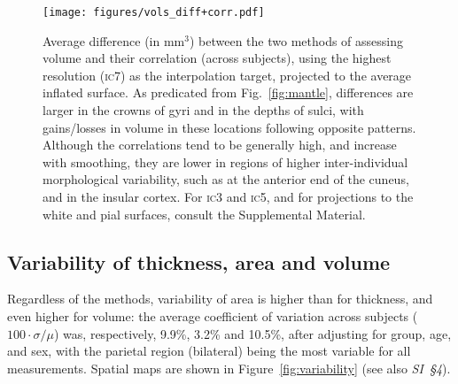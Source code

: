 \begin{figure}[t!]
\begin{center}
\texttt{[image: figures/vols\_diff+corr.pdf]}
\end{center}
\caption{Average difference (in mm$^3$) between the two methods of assessing volume and their correlation (across subjects), using the highest resolution (\textsc{ic}7) as the interpolation target, projected to the average inflated surface. As predicated from Fig.~\ref{fig:mantle}, differences are larger in the crowns of gyri and in the depths of sulci, with gains/losses in volume in these locations following opposite patterns. Although the correlations tend to be generally high, and increase with smoothing, they are lower in regions of higher inter-individual morphological variability, such as at the anterior end of the cuneus, and in the insular cortex. For \textsc{ic}3 and \textsc{ic5}, and for projections to the white and pial surfaces, consult the Supplemental Material.}
\label{fig:maps_vols}
\end{figure}

\subsection{Variability of thickness, area and volume}

Regardless of the methods, variability of area is higher than for thickness, and even higher for volume: the average coefficient of variation across subjects ($100\cdot\sigma/\mu$) was, respectively, 9.9\%, 3.2\% and 10.5\%, after adjusting for group, age, and sex, with the parietal region (bilateral) being the most variable for all measurements. Spatial maps are shown in Figure~\ref{fig:variability} (see also \emph{SI~§4}).

\begin{figure}[p!]
\end{figure}

